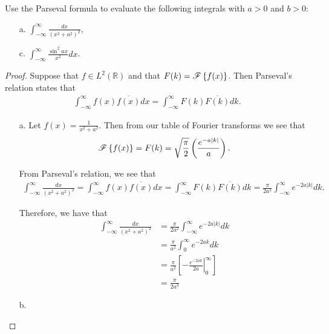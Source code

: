 \begin{problem}{2.23}
  Use the Parseval formula to evaluate the following integrals with $a >0$ and $b >0$:
  \begin{enumerate}
    \item[a.] $\displaystyle \int_{-\infty}^\infty \frac{dx}{(x^2 + a^2)^2}$,
    \item[c.] $\displaystyle \int_{-\infty}^\infty \frac{\sin^2 ax}{x^2}dx$.
  \end{enumerate}
\end{problem}

\begin{proof}
  Suppose that $f\in L^2(\mathbb{R})$ and that $F(k) = \mathscr{F}\left\{ {f(x)} \right\}$. Then Parseval's relation
  states that
  \begin{align*}
    \int_{-\infty}^\infty f(x)\overline{f(x)} dx = \int_{-\infty}^\infty F(k)\overline{F(k)} dk.
  \end{align*}

  \begin{enumerate}
    \item[a.] Let $\displaystyle f(x) = \frac{1}{x^2+a^2}$. Then from our table of Fourier transforms
      we see that
      \begin{align*}
        \mathscr{F}\left\{ {f(x)} \right\} = F(k) = \sqrt{\frac{\pi}{2}}\left(\frac{e^{-a|k|}}{a}\right).
      \end{align*}

      From Parseval's relation, we see that
      \begin{align*}
        \int_{-\infty}^\infty \frac{dx}{(x^2 + a^2)^2}
        = \int_{-\infty}^\infty f(x)\overline{f(x)} dx
        = \int_{-\infty}^\infty F(k)\overline{F(k)} dk
        = \frac{\pi}{2a^2}\int_{-\infty}^\infty e^{-2a|k|} dk.
      \end{align*}

      Therefore, we have that
      \begin{align*}
        \int_{-\infty}^\infty \frac{dx}{(x^2 + a^2)^2}
        &= \frac{\pi}{2a^2}\int_{-\infty}^\infty e^{-2a|k|} dk \\
        &= \frac{\pi}{a^2}\int_0^\infty e^{-2ak} dk \\
        &= \frac{\pi}{a^2}\left[ \left. -\frac{e^{-2a k}}{2a}\right\rvert_{0}^\infty \right] \\
        &= \frac{\pi}{2a^3}
      \end{align*}
    \item[b.]
  \end{enumerate}
\end{proof}
\newpage
